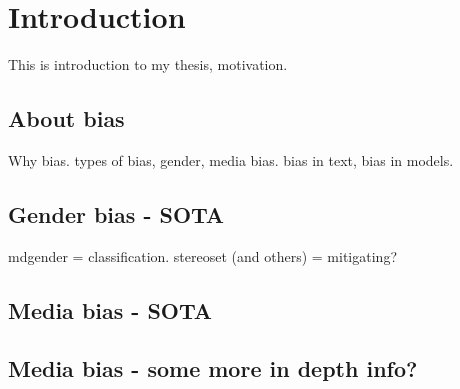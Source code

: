 \chapter{Introduction}
This is introduction to my thesis, motivation.

\section{About bias}
Why bias. types of bias, gender, media bias. bias in text, bias in models.

\section{Gender bias - SOTA}
mdgender = classification. stereoset (and others) = mitigating?
\section{Media bias - SOTA}
\section{Media bias - some more in depth info?}